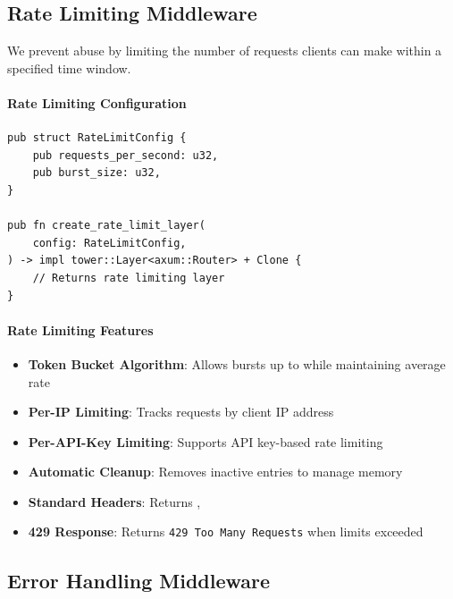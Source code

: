 \subsection{Rate Limiting Middleware}

We prevent abuse by limiting the number of requests clients can make within a specified time window.

\paragraph{Rate Limiting Configuration}

\begin{listing}[H]
\caption{Rate limiting configuration}
\label{lst:middleware-ratelimit-config}
\begin{verbatim}
pub struct RateLimitConfig {
    pub requests_per_second: u32,
    pub burst_size: u32,
}

pub fn create_rate_limit_layer(
    config: RateLimitConfig,
) -> impl tower::Layer<axum::Router> + Clone {
    // Returns rate limiting layer
}
\end{verbatim}
\end{listing}

\paragraph{Rate Limiting Features}

\begin{itemize}
  \item \textbf{Token Bucket Algorithm}: Allows bursts up to  while maintaining average rate
  \item \textbf{Per-IP Limiting}: Tracks requests by client IP address
  \item \textbf{Per-API-Key Limiting}: Supports API key-based rate limiting
  \item \textbf{Automatic Cleanup}: Removes inactive entries to manage memory
  \item \textbf{Standard Headers}: Returns , 
  \item \textbf{429 Response}: Returns \texttt{429 Too Many Requests} when limits exceeded
\end{itemize}

\subsection{Error Handling Middleware}


